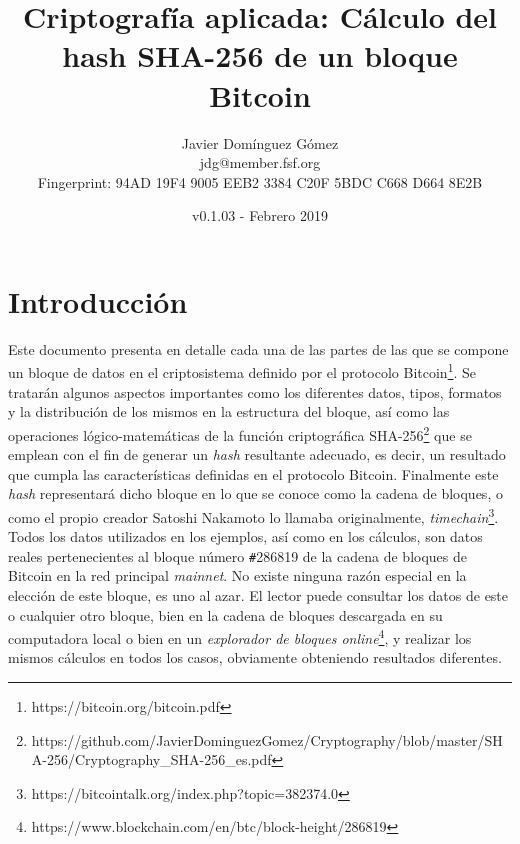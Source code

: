 \documentclass{article}
\title{\textbf{Criptografía aplicada: Cálculo del hash SHA-256 de un bloque Bitcoin}}
\author{Javier Domínguez Gómez \\
\small{jdg@member.fsf.org} \\
\small{Fingerprint: 94AD 19F4 9005 EEB2 3384 C20F 5BDC C668 D664 8E2B}}
\date{v0.1.03 - Febrero 2019}
\begin{document}
\maketitle

\tableofcontents{}

\section{Introducción}
    Este documento presenta en detalle cada una de las partes de las que se compone un bloque de datos en el criptosistema definido por el protocolo Bitcoin\footnote{https://bitcoin.org/bitcoin.pdf}. Se tratarán algunos aspectos importantes como los diferentes datos, tipos, formatos y la distribución de los mismos en la estructura del bloque, así como las operaciones lógico-matemáticas de la función criptográfica SHA-256\footnote{https://github.com/JavierDominguezGomez/Cryptography/blob/master/SHA-256/Cryptography\_SHA-256\_es.pdf} que se emplean con el fin de generar un \textit{hash} resultante adecuado, es decir, un resultado que cumpla las características definidas en el protocolo Bitcoin. Finalmente este \textit{hash} representará dicho bloque en lo que se conoce como la cadena de bloques, o como el propio creador Satoshi Nakamoto lo llamaba originalmente, \textit{timechain}\footnote{https://bitcointalk.org/index.php?topic=382374.0}. Todos los datos utilizados en los ejemplos, así como en los cálculos, son datos reales pertenecientes al bloque número \texttt{\#}286819 de la cadena de bloques de Bitcoin en la red principal \textit{mainnet}. No existe ninguna razón especial en la elección de este bloque, es uno al azar. El lector puede consultar los datos de este o cualquier otro bloque, bien en la cadena de bloques descargada en su computadora local o bien en un \textit{explorador de bloques online}\footnote{https://www.blockchain.com/en/btc/block-height/286819}, y realizar los mismos cálculos en todos los casos, obviamente obteniendo resultados diferentes.
    
\end{document}
